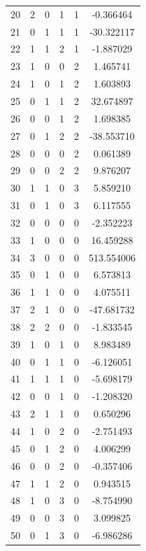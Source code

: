 \documentclass[preprint,12pt]{elsarticle}
\begin{document}
\begin{table}
\begin{minipage}[!h]{0.25\textwidth}
{\begin{tabular}{|c|cccc|c|}
20 &   2 &   0 &   1 &   1 &   -0.366464 \\
21 &   0 &   1 &   1 &   1 &  -30.322117 \\
22 &   1 &   1 &   2 &   1 &   -1.887029 \\
23 &   1 &   0 &   0 &   2 &    1.465741 \\
24 &   1 &   0 &   1 &   2 &    1.603893 \\
25 &   0 &   1 &   1 &   2 &   32.674897 \\
26 &   0 &   0 &   1 &   2 &    1.698385 \\
27 &   0 &   1 &   2 &   2 &  -38.553710 \\
28 &   0 &   0 &   0 &   2 &    0.061389 \\
29 &   0 &   0 &   2 &   2 &    9.876207 \\
30 &   1 &   1 &   0 &   3 &    5.859210 \\
31 &   0 &   1 &   0 &   3 &    6.117555 \\
32 &   0 &   0 &   0 &   0 &   -2.352223 \\
33 &   1 &   0 &   0 &   0 &   16.459288 \\
34 &   3 &   0 &   0 &   0 &  513.554006 \\
35 &   0 &   1 &   0 &   0 &    6.573813 \\
36 &   1 &   1 &   0 &   0 &    4.075511 \\
37 &   2 &   1 &   0 &   0 &  -47.681732 \\
38 &   2 &   2 &   0 &   0 &   -1.833545 \\
39 &   1 &   0 &   1 &   0 &    8.983489 \\
40 &   0 &   1 &   1 &   0 &   -6.126051 \\
41 &   1 &   1 &   1 &   0 &   -5.698179 \\
42 &   0 &   0 &   1 &   0 &   -1.208320 \\
43 &   2 &   1 &   1 &   0 &    0.650296 \\
44 &   1 &   0 &   2 &   0 &   -2.751493 \\
45 &   0 &   1 &   2 &   0 &    4.006299 \\
46 &   0 &   0 &   2 &   0 &   -0.357406 \\
47 &   1 &   1 &   2 &   0 &    0.943515 \\
48 &   1 &   0 &   3 &   0 &   -8.754990 \\
49 &   0 &   0 &   3 &   0 &    3.099825 \\
50 &   0 &   1 &   3 &   0 &   -6.986286 \\

\end{tabular}}
\end{minipage}
\end{table}
\end{document}
